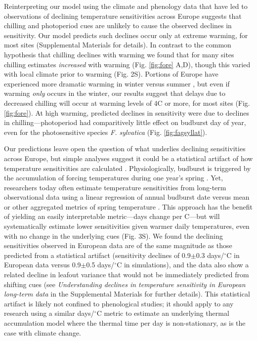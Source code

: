 \documentclass{article}
\begin{document}
\par Reinterpreting our model using the climate and phenology data that have led to observations of declining temperature sensitivities across Europe suggests that chilling and photoperiod cues are unlikely to cause the observed declines in sensitivity. Our model predicts such declines occur only at extreme warming, for most sites (Supplemental Materials for details). In contrast to the common hypothesis that chilling declines with warming we found that for many sites chilling estimates \emph{increased} with warming (Fig. \ref{fig:fore} A,D), though this varied with local climate prior to warming (Fig. 2S). 
Portions of Europe have experienced more dramatic warming in winter versus summer \cite{balling1998}, but even if warming \emph{only} occurs in the winter, our results suggest that delays due to decreased chilling will occur at warming levels of 4\degree C or more, for most sites (Fig. \ref{fig:fore}). At high warming, predicted declines in sensitivity were due to declines in chilling---photoperiod had comparitively little effect on budburst day of year, even for the photosensitive species \emph{F. sylvatica} (Fig. \ref{fig:fagsyllat}). 

\par Our predictions leave open the question of what underlies declining sensitivities across Europe, but simple analyses suggest it could be a statistical artifact of how temperature sensitivities are calculated \citep{vitasse2018,gusewell2017}. Physiologically, budburst is triggered by the accumulation of forcing temperatures during one year's spring \citep{hanninen1995,chuine2016}. Yet, researchers today often estimate temperature sensitivities from long-term observational data using a linear regression of annual budburst date versus mean or other aggregated metrics of spring temperature \citep[e.g.,][]{Wolkovich:2012n}. This approach has the benefit of yielding an easily interpretable metric---days change per \degree C---but will systematically estimate lower sensitivities given warmer daily temperatures, even with no change in the underlying cues (Fig. 3S). We found the declining sensitivities observed in European data are of the same magnitude as those predicted from a statistical artifact (sensitivity declines of 0.9$\pm$0.3 days/$^{\circ}$C in European data versus 0.9$\pm$0.5 days/$^{\circ}$C in simulations), and the data also show a related decline in leafout variance that would not be immediately predicted from shifting cues (see \emph{Understanding declines in temperature sensitivity in European long-term data} in the Supplemental Materials for further details). This statistical artifact is likely not confined to phenological studies; it should apply to any research using a similar days/$^{\circ}$C metric to estimate an underlying thermal accumulation model where the thermal time per day is non-stationary, as is the case with climate change. 
\end{document}
